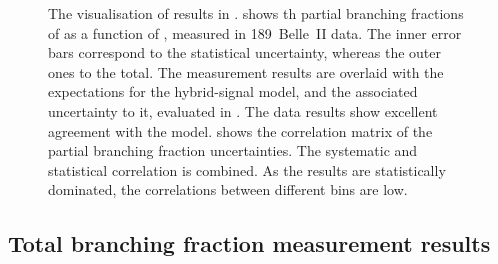 \begin{figure}[htbp!]
    \centering
    \caption{\label{fig:partial_and_correlation} 
    The visualisation of results in  .
     shows th partial branching fractions of \BtoXsgamma 
    as a function of \EB, measured in 189~\invfb Belle~II data.
    The inner error bars correspond to the statistical uncertainty, whereas the outer ones to the total.
    The measurement results are overlaid with the expectations for the hybrid-signal model, and the associated uncertainty to it, evaluated in .
    The data results show excellent agreement with the model.
     shows 
    the correlation matrix of the partial branching fraction uncertainties.
    The systematic and statistical correlation is combined.
    As the results are statistically dominated, the correlations between different \EB bins are low.
    }
\end{figure}

\subsection{Total branching fraction measurement results}\label{sec:total_branching_fraction_results}

